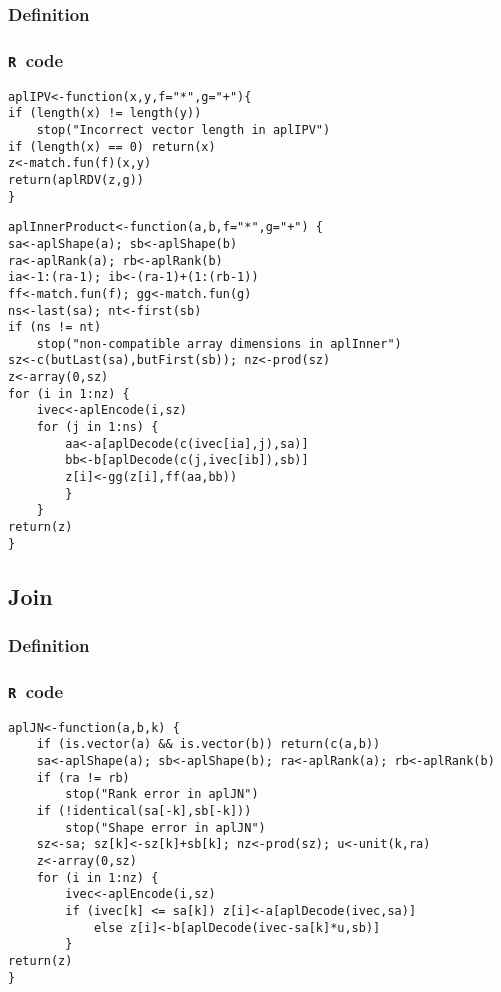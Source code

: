 \documentclass[11pt]{amsart}
\theoremstyle{plain}
\theoremstyle{definition}
\theoremstyle{remark}
\newcommand{\tR}{\texttt{R}}
\begin{document}
\subsubsection{Definition}
\subsubsection{\tR\ code}\quad
\begin{lstlisting}
aplIPV<-function(x,y,f="*",g="+"){
if (length(x) != length(y))
    stop("Incorrect vector length in aplIPV")
if (length(x) == 0) return(x)
z<-match.fun(f)(x,y)
return(aplRDV(z,g))
}
\end{lstlisting}
\begin{lstlisting}
aplInnerProduct<-function(a,b,f="*",g="+") {
sa<-aplShape(a); sb<-aplShape(b)
ra<-aplRank(a); rb<-aplRank(b)
ia<-1:(ra-1); ib<-(ra-1)+(1:(rb-1))
ff<-match.fun(f); gg<-match.fun(g)
ns<-last(sa); nt<-first(sb)
if (ns != nt) 
    stop("non-compatible array dimensions in aplInner")
sz<-c(butLast(sa),butFirst(sb)); nz<-prod(sz)
z<-array(0,sz)
for (i in 1:nz) {
    ivec<-aplEncode(i,sz)
    for (j in 1:ns) {
        aa<-a[aplDecode(c(ivec[ia],j),sa)]
        bb<-b[aplDecode(c(j,ivec[ib]),sb)]
        z[i]<-gg(z[i],ff(aa,bb))
        }
    }
return(z)
}
\end{lstlisting}

\subsection{Join}\quad
\subsubsection{Definition}
\subsubsection{\tR\ code}\quad
\begin{lstlisting}
aplJN<-function(a,b,k) {
    if (is.vector(a) && is.vector(b)) return(c(a,b))
    sa<-aplShape(a); sb<-aplShape(b); ra<-aplRank(a); rb<-aplRank(b)
    if (ra != rb)
        stop("Rank error in aplJN")
    if (!identical(sa[-k],sb[-k]))
        stop("Shape error in aplJN")
    sz<-sa; sz[k]<-sz[k]+sb[k]; nz<-prod(sz); u<-unit(k,ra)
    z<-array(0,sz)
    for (i in 1:nz) {
        ivec<-aplEncode(i,sz)
        if (ivec[k] <= sa[k]) z[i]<-a[aplDecode(ivec,sa)]
            else z[i]<-b[aplDecode(ivec-sa[k]*u,sb)]
        }
return(z)
}
\end{lstlisting}
\end{document}
